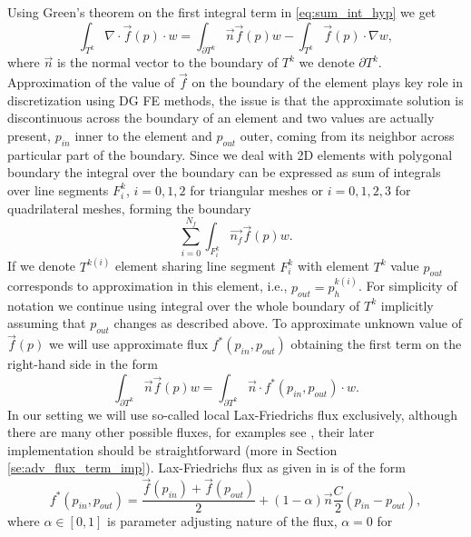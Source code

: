 Using Green's theorem on the first integral term in \eqref{eq:sum_int_hyp} we 
get
\begin{equation}
\label{eq:hyp_term}
\int_{T^k} \nabla\cdot \vec{f}(p)\cdot w = %
\int_{\partial{T^k}} \vec{n}\vec{f}(p)w - \int_{T^k} \vec{f}(p)\cdot\nabla w,
\end{equation}
where $\vec{n}$ is the normal vector to the boundary of $T^k$ we denote 
$\partial T^k$. Approximation of the value of $\vec{f}$ on the boundary of the 
element plays key role in discretization using DG FE methods, the issue is 
that the approximate solution is discontinuous across the boundary of an 
element and two values are actually present, $p_{in}$ inner to the element and 
$p_{out}$ outer, coming from its neighbor across particular part of the 
boundary. Since we deal with 2D 
elements with polygonal boundary the integral over the boundary can be expressed as sum 
of integrals over line segments ${F^k_i}$, $i=0,1,2$ for triangular meshes or 
$i=0,1,2,3$ for quadrilateral meshes, forming the boundary
\begin{equation}
\sum_{i=0}^{N_f} \int_{F^k_i} \vec{n_f}\vec{f}(p)w.
\end{equation}
If we denote $T^{k(i)}$ element sharing line segment $F^k_i$ with element $T^k$
value $p_{out}$ corresponds to approximation in this element, i.e., $p_{out} = 
p^{k(i)}_h$. For simplicity of notation we continue using integral over the whole 
boundary of $T^k$ implicitly assuming that $p_{out}$ changes as described above. To 
approximate unknown value of $\vec{f}(p)$  we will use approximate flux $f^*(p_{in}, 
p_{out})$ obtaining the first term on the right-hand side in the form
\begin{equation}
\label{eq:flux_integral}
\int_{\partial{T^k}} \vec{n}\vec{f}(p)w = \int_{\partial{T^k}} \vec{n} 
\cdot f^{*} (p_{in}, p_{out})\cdot w.
\end{equation}
In our setting we will use so-called local Lax-Friedrichs flux 
exclusively, although there are many other possible fluxes, for examples see 
\cite{Kucera, Cockburn2001a}, their later implementation should be straightforward (more 
in Section \ref{se:adv_flux_term_imp}). Lax-Friedrichs flux as given in 
\cite{Hesthaven2008} 
is of the form
\begin{equation}
\label{eq:lax-frieflux}
f^{*}(p_{in}, p_{out}) =   \frac{\vec{f}(p_{in}) + \vec{f}(p_{out})}{2}  + (1-\alpha) 
\vec{n}\frac{C}{2}(p_{in} - 
p_{out}),
\end{equation}
where $\alpha \in [0, 1]$ is parameter adjusting nature of the flux, $\alpha = 0$ for 
